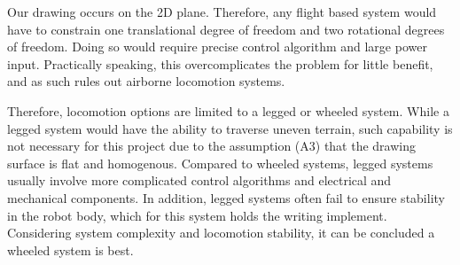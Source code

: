 Our drawing occurs on the 2D plane. Therefore, any flight based system would have to constrain one translational degree of freedom and two rotational degrees of freedom. Doing so would require precise control algorithm and large power input. Practically speaking, this overcomplicates the problem for little benefit, and as such rules out airborne locomotion systems.

Therefore, locomotion options are limited to a legged or wheeled system. While a legged system would have the ability to traverse uneven terrain, such capability is not necessary for this project due to the assumption (A3) that the drawing surface is flat and homogenous. Compared to wheeled systems, legged systems usually involve more complicated control algorithms and electrical and mechanical components. In addition, legged systems often fail to ensure stability in the robot body, which for this system holds the writing implement. Considering system complexity and locomotion stability, it can be concluded a wheeled system is best.

